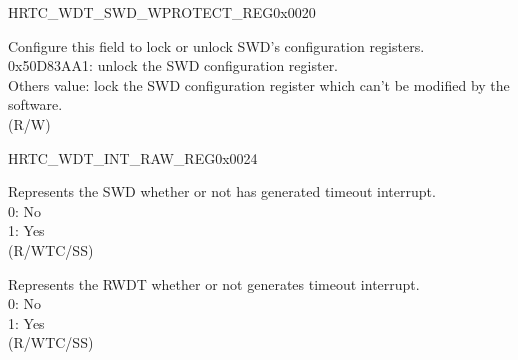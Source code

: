 \begin{register}{H}{RTC\_WDT\_SWD\_WPROTECT\_REG}{0x0020}\label{regdesc:RTCWDTSWDWPROTECTREG}
%
\regnewline%
\begin{regdesc}\begin{reglist}
\label{fielddesc:RTCWDTSWDWKEY}\item [RTC\_WDT\_SWD\_WKEY] Configure this field to lock or unlock SWD's configuration registers.\\
0x50D83AA1: unlock the SWD configuration register. \\
Others value: lock the SWD configuration register which can't be modified by the software.\\
 (R/W)
\end{reglist}\end{regdesc}
\end{register}


\begin{register}{H}{RTC\_WDT\_INT\_RAW\_REG}{0x0024}\label{regdesc:RTCWDTINTRAWREG}
%
%
%
\regnewline%
\begin{regdesc}\begin{reglist}
\label{fielddesc:RTCWDTSWDTINTRAW}\item [RTC\_WDT\_SWDT\_INT\_RAW] Represents the SWD whether or not has generated timeout interrupt.\\
0: No \\
1: Yes  \\ (R/WTC/SS)
\label{fielddesc:RTCWDTRWDTINTRAW}\item [RTC\_WDT\_RWDT\_INT\_RAW] Represents the RWDT whether or not generates timeout interrupt.\\
0: No \\
1: Yes  \\ (R/WTC/SS)
\end{reglist}\end{regdesc}
\end{register}


